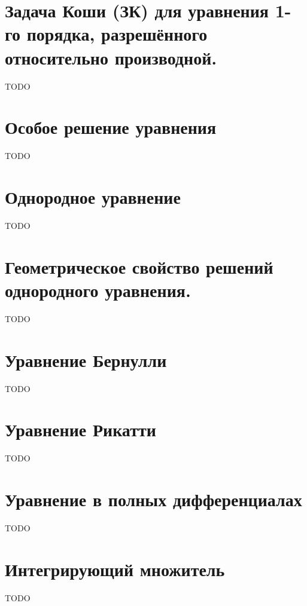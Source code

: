 \documentclass{article}
\begin{document}
\section*{Задача Коши (ЗК) для уравнения 1-го порядка, разрешённого относительно производной.}
TODO

{}
\section*{Особое решение уравнения}
TODO

{}
\section*{Однородное уравнение}
TODO

{}
\section*{Геометрическое свойство решений однородного уравнения.}
TODO

{}
\section*{Уравнение Бернулли}
TODO

{}
\section*{Уравнение Рикатти}
TODO

{}
\section*{Уравнение в полных дифференциалах}
TODO

{}
\section*{Интегрирующий множитель}
TODO

{}
\end{document}
